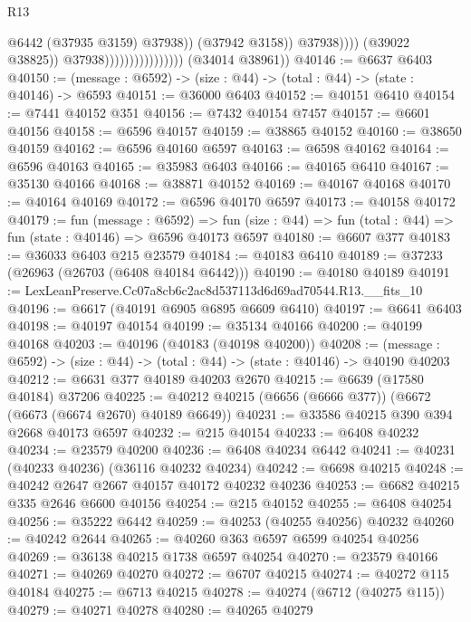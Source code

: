 \begin{lexlean}{R13}
\begin{coremodule}
                                                      @6442
                                                      (@37935 @3159)
                                                      @37938))
                                                  (@37942 @3158))
                                                @37938))))
                                        (@39022 @38825))
                                      @37938))))))))))))))))
      (@34014 @38961))
@40146 := @6637 @6403
@40150 := (message : @6592) -> (size : @44) -> (total : @44) -> (state : @40146) -> @6593
@40151 := @36000 @6403
@40152 := @40151 @6410
@40154 := @7441 @40152 @351
@40156 := @7432 @40154 @7457
@40157 := @6601 @40156
@40158 := @6596 @40157
@40159 := @38865 @40152
@40160 := @38650 @40159
@40162 := @6596 @40160 @6597
@40163 := @6598 @40162
@40164 := @6596 @40163
@40165 := @35983 @6403
@40166 := @40165 @6410
@40167 := @35130 @40166
@40168 := @38871 @40152
@40169 := @40167 @40168
@40170 := @40164 @40169
@40172 := @6596 @40170 @6597
@40173 := @40158 @40172
@40179 := fun (message : @6592) =>
  fun (size : @44) => fun (total : @44) => fun (state : @40146) => @6596 @40173 @6597
@40180 := @6607 @377
@40183 := @36033 @6403 @215 @23579
@40184 := @40183 @6410
@40189 := @37233 (@26963 (@26703 (@6408 @40184 @6442)))
@40190 := @40180 @40189
@40191 := LexLeanPreserve.Cc07a8cb6c2ac8d537113d6d69ad70544.R13.__fits_10
@40196 := @6617 (@40191 @6905 @6895 @6609 @6410)
@40197 := @6641 @6403
@40198 := @40197 @40154
@40199 := @35134 @40166
@40200 := @40199 @40168
@40203 := @40196 (@40183 (@40198 @40200))
@40208 := (message : @6592) -> (size : @44) -> (total : @44) -> (state : @40146) -> @40190 @40203
@40212 := @6631 @377 @40189 @40203 @2670
@40215 := @6639 (@17580 @40184) @37206
@40225 := @40212 @40215 (@6656 (@6666 @377)) (@6672 (@6673 (@6674 @2670) @40189 @6649))
@40231 := @33586 @40215 @390 @394 @2668 @40173 @6597
@40232 := @215 @40154
@40233 := @6408 @40232
@40234 := @23579 @40200
@40236 := @6408 @40234 @6442
@40241 := @40231 (@40233 @40236) (@36116 @40232 @40234)
@40242 := @6698 @40215
@40248 := @40242 @2647 @2667 @40157 @40172 @40232 @40236
@40253 := @6682 @40215 @335 @2646 @6600 @40156
@40254 := @215 @40152
@40255 := @6408 @40254
@40256 := @35222 @6442
@40259 := @40253 (@40255 @40256) @40232
@40260 := @40242 @2644
@40265 := @40260 @363 @6597 @6599 @40254 @40256
@40269 := @36138 @40215 @1738 @6597 @40254
@40270 := @23579 @40166
@40271 := @40269 @40270
@40272 := @6707 @40215
@40274 := @40272 @115 @40184
@40275 := @6713 @40215
@40278 := @40274 (@6712 (@40275 @115))
@40279 := @40271 @40278
@40280 := @40265 @40279

\end{coremodule}
\end{lexlean}
